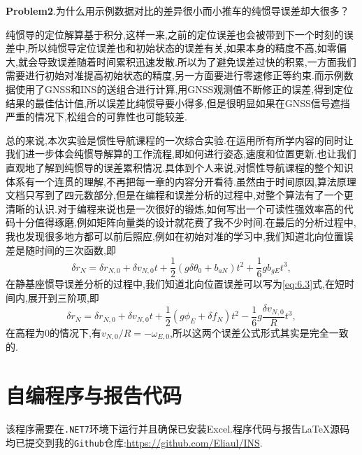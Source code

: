 \documentclass[10pt,a4paper]{ctexart}
\begin{document}
\noindent\textbf{Problem2}.为什么用示例数据对比的差异很小而小推车的纯惯导误差却大很多？

\noindent 纯惯导的定位解算基于积分,这样一来,之前的定位误差也会被带到下一个时刻的误差中,所以纯惯导定位误差也和初始状态的误差有关,如果\IMU 本身的精度不高,如零偏大,就会导致误差随着时间累积迅速发散.所以为了避免误差过快的积累,一方面我们需要进行初始对准提高初始状态的精度,另一方面要进行零速修正等约束.而示例数据使用了\textsf{GNSS}和\textsf{INS}的送组合进行计算,用\textsf{GNSS}观测值不断修正\IMU 的误差,得到定位结果的最佳估计值,所以误差比纯惯导要小得多,但是很明显如果在\textsf{GNSS}信号遮挡严重的情况下,松组合的可靠性也可能较差.

总的来说,本次实验是惯性导航课程的一次综合实验.在运用所有所学内容的同时让我们进一步体会纯惯导解算的工作流程,即如何进行姿态,速度和位置更新.也让我们直观地了解到纯惯导的误差累积情况.具体到个人来说,对惯性导航课程的整个知识体系有一个连贯的理解,不再把每一章的内容分开看待.虽然由于时间原因,算法原理文档只写到了四元数部分,但是在编程和误差分析的过程中,对整个算法有了一个更清晰的认识.对于编程来说也是一次很好的锻炼,如何写出一个可读性强效率高的代码十分值得琢磨,例如矩阵向量类的设计就花费了我不少时间.在最后的分析过程中,我也发现很多地方都可以前后照应,例如在初始对准的学习中,我们知道北向位置误差是随时间的三次函数,即
\[
    \delta r_N =\delta r_{N,0} +\delta v_{N,0}t + \frac{1}{2}(g\delta \theta_0 + b_{aN})t^2 + \frac{1}{6}gb_{gE}t^3,
\]
在静基座惯导误差分析的过程中,我们知道北向位置误差可以写为\eqref{eq:6.3}式,在短时间内,展开到三阶项,即
\[
    \delta r_N =\delta r_{N,0} +\delta v_{N,0}t + \frac{1}{2}(g\phi_E +\delta f_N)t^2 - \frac{1}{6}g\frac{\delta v_{N,0}}{R} t^3,
\]
在高程为$0$的情况下,有$v_{N,0}/R=-\omega_{E,0}$,所以这两个误差公式形式其实是完全一致的.

\appendix
\section{自编程序与报告代码}
\noindent 该程序需要在\texttt{.NET7}环境下运行并且确保已安装\textsf{Excel}.程序代码与报告\LaTeX 源码均已提交到我的\texttt{Github}\hspace{0mm}仓库:\url{https://github.com/Eliaul/INS}.
\end{document}

